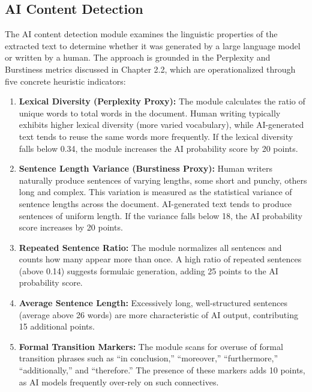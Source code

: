     \subsection{AI Content Detection}
    \label{sec:ai_content_detection}
    
    The AI content detection module examines the linguistic properties of the extracted text to determine whether it was generated by a large language model or written by a human. The approach is grounded in the Perplexity and Burstiness metrics discussed in Chapter 2.2, which are operationalized through five concrete heuristic indicators:
    
    \begin{enumerate}
        \item \textbf{Lexical Diversity (Perplexity Proxy):} The module calculates the ratio of unique words to total words in the document. Human writing typically exhibits higher lexical diversity (more varied vocabulary), while AI-generated text tends to reuse the same words more frequently. If the lexical diversity falls below 0.34, the module increases the AI probability score by 20 points.
    
        \item \textbf{Sentence Length Variance (Burstiness Proxy):} Human writers naturally produce sentences of varying lengths, some short and punchy, others long and complex. This variation is measured as the statistical variance of sentence lengths across the document. AI-generated text tends to produce sentences of uniform length. If the variance falls below 18, the AI probability score increases by 20 points.
    
        \item \textbf{Repeated Sentence Ratio:} The module normalizes all sentences and counts how many appear more than once. A high ratio of repeated sentences (above 0.14) suggests formulaic generation, adding 25 points to the AI probability score.
    
        \item \textbf{Average Sentence Length:} Excessively long, well-structured sentences (average above 26 words) are more characteristic of AI output, contributing 15 additional points.
    
        \item \textbf{Formal Transition Markers:} The module scans for overuse of formal transition phrases such as ``in conclusion,'' ``moreover,'' ``furthermore,'' ``additionally,'' and ``therefore.'' The presence of these markers adds 10 points, as AI models frequently over-rely on such connectives.
    \end{enumerate}
    
